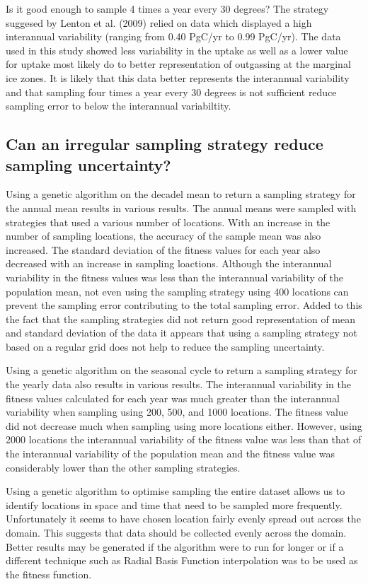 \documentclass[11pt, a4paper]{article}
\numberwithin{figure}{section}
\numberwithin{table}{section}
\begin{document}
Is it good enough to sample 4 times a year every 30 degrees? The strategy suggesed by Lenton
et al. (2009) relied on data which displayed a high interannual variability (ranging
from 0.40 PgC/yr to 0.99 PgC/yr). 
The data used in this study showed less variability in the uptake as well 
as a lower value for uptake most likely do to better representation of outgassing
at the marginal ice zones.
It is likely that this data better represents the interannual variability
and that sampling four times a year every 30 degrees is not sufficient
reduce sampling error to below the interannual variabiltity. 
%

\subsection{Can an irregular sampling strategy reduce sampling uncertainty?}
Using a genetic algorithm on the decadel mean to return a sampling strategy
for the annual mean results in various results. 
The annual means were sampled with strategies that used a various number of 
locations. With an increase in the number of sampling locations, the accuracy
of the sample mean was also increased. The standard deviation of the fitness
values for each year also decreased with an increase in sampling loactions.
Although the interannual variability in the fitness values was less than the 
interannual variability of the population mean, not even using the sampling 
strategy using 400 locations can prevent the sampling error contributing
to the total sampling error.
Added to this the fact that the sampling strategies did not return good
representation of mean and standard deviation of the data it appears that
using a sampling strategy not based on a regular grid does not
help to reduce the sampling uncertainty.


Using a genetic algorithm on the seasonal cycle to return a sampling strategy
for the yearly data also results in various results.
The interannual variability in the fitness values calculated for each
year was much greater than the interannual variability when sampling using 
200, 500, and 1000 locations. 
The fitness value did not decrease much when sampling using more locations either.
However, using 2000 locations the interannual variability of the fitness value
was less than that of the interannual variability of the population mean and the fitness
value was considerably lower than the other sampling strategies.

Using a genetic algorithm to optimise sampling the entire dataset allows us 
to identify locations in space and time that need to be sampled more frequently.
Unfortunately it seems to have chosen location fairly evenly spread out across the domain.
This suggests that data should be collected evenly across the domain. Better results may 
be generated if the algorithm were to run for longer or if a different technique such as Radial Basis Function
interpolation was to be used as the fitness function.
		
\end{document}
